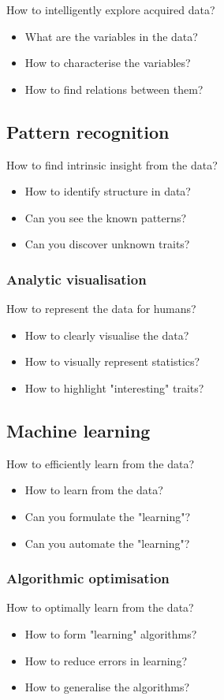 \documentclass[11pt]{article}
\begin{document}
How to intelligently explore acquired data?
\begin{itemize}
\item What are the variables in the data?
\item How to characterise the variables?
\item How to find relations between them?
\end{itemize}
\subsection{Pattern recognition}
\label{sec:orgd44b931}
How to find intrinsic insight from the data?
\begin{itemize}
\item How to identify structure in data?
\item Can you see the known patterns?
\item Can you discover unknown traits?
\end{itemize}
\subsubsection{Analytic visualisation}
\label{sec:org5100345}
How to represent the data for humans?
\begin{itemize}
\item How to clearly visualise the data?
\item How to visually represent statistics?
\item How to highlight "interesting" traits?
\end{itemize}
\subsection{Machine learning}
\label{sec:orge8e960b}
How to efficiently learn from the data?
\begin{itemize}
\item How to learn from the data?
\item Can you formulate the "learning"?
\item Can you automate the "learning"?
\end{itemize}
\subsubsection{Algorithmic optimisation}
\label{sec:orgf8effd1}
How to optimally learn from the data?
\begin{itemize}
\item How to form "learning" algorithms?
\item How to reduce errors in learning?
\item How to generalise the algorithms?
\end{itemize}
\end{document}
